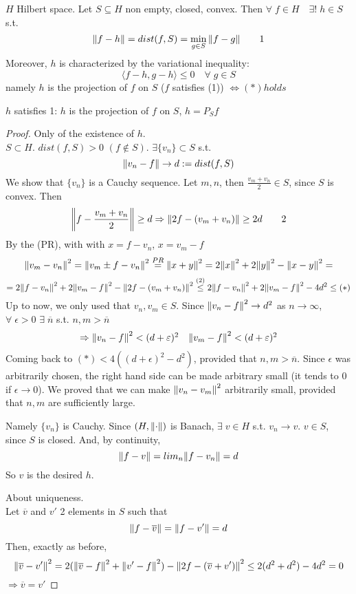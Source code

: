 \begin{theorem}
    \(H\) Hilbert space. Let \(S \subseteq H\) non empty, closed, convex. Then \(\forall \; f \in H \quad \exists! \; h \in S\) s.t. 
    \[
        \norm{f-h} = dist (f, S) = \min_{g \in S} \norm{f-g} \tag*{1}
    \]
    Moreover, \(h\) is characterized by the variational inequality:
    \[
        \langle f-h, g-h \rangle \leq 0 \quad \forall \; g \in S \tag*{*}
    \]
    namely \(h\) is the projection of \(f \) on \(S\) (\(f\) satisfies (1)) \(\iff (*) holds\)
\end{theorem}
\begin{remark}
    \(h\) satisfies 1: \(h\) is the projection of \(f\) on \(S\), \(h = P_S f\)
\end{remark}
\begin{proof}
    Only of the existence of \(h\). \\
    \(S \subset H\). \(dist(f, S) >0\) \((f \notin S )\). \(\exists \{v_n\} \subset S\) s.t. 
    \[
        \norm{v_n -f} \to d := dist(f, S)    
    \] 
    We show that \(\{v_n\}\) is a Cauchy sequence. Let \(m, n\), then \(\frac{v_m + v_n}{2} \in S\), since \(S\) is convex. Then 
    \[
        \norm{f - \frac{v_m + v_n}{2}} \geq d \Rightarrow \norm{2f - (v_m + v_n)} \geq 2d \tag*{2}
    \]
    By the (PR), with with \(x=f-v_n\), \(x=v_m-f\)
    \[
        \norm{v_m - v_n}^2 
        = \norm{v_m \pm f - v_n}^2 
        \overset{PR }{=} \norm{x+y}^2
        = 2\norm{x}^2 + 2 \norm{y}^2 - \norm{x-y}^2 =
    \]
    \[
        = 2 \norm{f-v_n}^2 + 2 \norm{v_m - f }^2 - \norm{2f - (v_m + v_n)}^2
        \overset{(2)}{\leq} 2 \norm{f - v_n}^2 + 2 \norm{v_m - f}^2 - 4d^2 \leq (*)
    \]
    Up to now, we only used that \(v_n , v_m \in S\). Since \(\norm{v_n -f }^2 \to d^2\) as \(n \to \infty\), \(\forall\; \epsilon>0 \) \(\exists \; \overline{n}\) s.t. \(n, m > \overline{n}\)
    \[
        \begin{array}{ll}
            \Rightarrow \norm{v_n - f}^2 < (d+\varepsilon)^2 & \norm{v_m - f}^2 < (d+\varepsilon)^2
        \end{array}
    \]
    Coming back to \((*)< 4((d+\epsilon)^2 -d^2)\), provided that \(n, m > \overline{n}\). Since \(\epsilon\) was arbitrarily chosen, the right hand side can be made arbitrary small (it tends to 0 if \(\epsilon \to 0\)). 
    We proved that we can make \(\norm{v_n - v_m}^2\) arbitrarily small, provided that \(n, m\) are sufficiently large.
    
    Namely \(\{v_n\}\) is Cauchy. Since \((H, \norm{\cdot})\) is Banach, \(\exists \; v \in H\) s.t. \(v_n \to v\). \(v \in S\), since \(S\) is closed. And, by continuity, 
    \[
        \norm{f-v} = lim_n \norm{f - v_n} = d
    \]
    So \(v\) is the desired \(h\).
    
    About uniqueness. \\
    Let \(\overline{v}\) and \(v'\) 2 elements in \(S\) such that
    \[
        \norm{f- \overline{v}} = \norm{f - v'} = d
    \]
    Then, exactly as before, 
    \[
        \norm{\overline{v} - v'}^2 = 2(\norm{\overline{v} - f}^2 + \norm{v' -f}^2) - \norm{2f - (\overline{v}+v')}^2 \leq 2 (d^2+d^2)-4d^2 = 0
    \]
    \(\Rightarrow \overline{v} = v'\)
\end{proof}

